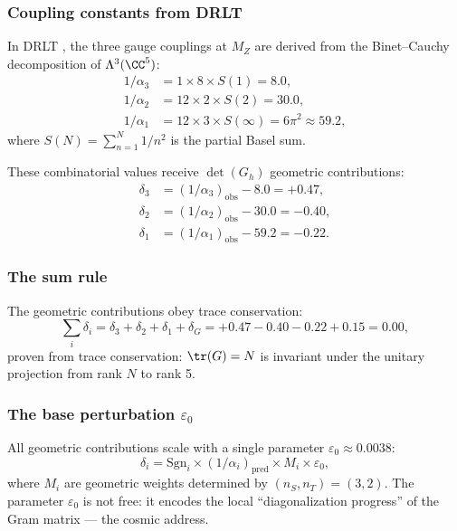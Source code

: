 \subsubsection{Coupling constants from DRLT}

In DRLT , the three gauge couplings at $M_Z$ are derived from the Binet--Cauchy decomposition of $\Lambda^3(\CC^5)$:
\begin{align}
1/\alpha_3 &= 1 \times 8 \times S(1) = 8.0, \\
1/\alpha_2 &= 12 \times 2 \times S(2) = 30.0, \\
1/\alpha_1 &= 12 \times 3 \times S(\infty) = 6\pi^2 \approx 59.2,
\end{align}
where $S(N) = \sum_{n=1}^{N} 1/n^2$ is the partial Basel sum.

These combinatorial values receive $\det(G_h)$ geometric contributions:
\begin{align}
\delta_3 &= (1/\alpha_3)_\text{obs} - 8.0 = +0.47, \\
\delta_2 &= (1/\alpha_2)_\text{obs} - 30.0 = -0.40, \\
\delta_1 &= (1/\alpha_1)_\text{obs} - 59.2 = -0.22.
\end{align}

\subsubsection{The sum rule}

The geometric contributions obey trace conservation:
\begin{equation}
\sum_i \delta_i = \delta_3 + \delta_2 + \delta_1 + \delta_G = +0.47 - 0.40 - 0.22 + 0.15 = 0.00,
\end{equation}
proven from trace conservation: $\tr(G) = N$ is invariant under the unitary projection from rank $N$ to rank 5.

\subsubsection{The base perturbation $\varepsilon_0$}

All geometric contributions scale with a single parameter $\varepsilon_0 \approx 0.0038$:
\begin{equation}
\delta_i = \text{Sgn}_i \times (1/\alpha_i)_\text{pred} \times M_i \times \varepsilon_0,
\end{equation}
where $M_i$ are geometric weights determined by $(n_S, n_T) = (3, 2)$. The parameter $\varepsilon_0$ is not free: it encodes the local ``diagonalization progress'' of the Gram matrix --- the cosmic address.

